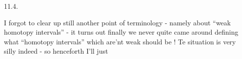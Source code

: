 11.4.

I forgot to clear up still another point of terminology  -  namely
about ``weak homotopy intervals'' -  it turns out finally we never quite
came around defining what ``homotopy intervals'' which are'nt weak should
be !   Te situation is very silly indeed  -  so henceforth I'll just

